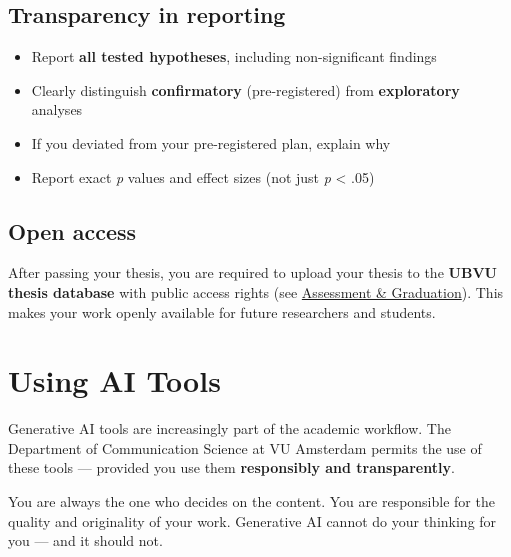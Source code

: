 \documentclass[
  11pt,
  a4paper,
]{scrbook}
\providecommand{\tightlist}{%
  \setlength{\itemsep}{0pt}\setlength{\parskip}{0pt}}\usepackage{longtable,booktabs,array}
\begin{document}
\section{Transparency in reporting}\label{transparency-in-reporting}

\begin{itemize}
\tightlist
\item
  Report \textbf{all tested hypotheses}, including non-significant
  findings
\item
  Clearly distinguish \textbf{confirmatory} (pre-registered) from
  \textbf{exploratory} analyses
\item
  If you deviated from your pre-registered plan, explain why
\item
  Report exact \emph{p} values and effect sizes (not just \emph{p}
  \textless{} .05)
\end{itemize}

\section{Open access}\label{open-access}

After passing your thesis, you are required to upload your thesis to the
\textbf{UBVU thesis database} with public access rights (see
\href{assessment.qmd}{Assessment \& Graduation}). This makes your work
openly available for future researchers and students.

\chapter{Using AI Tools}\label{using-ai-tools}

Generative AI tools are increasingly part of the academic workflow. The
Department of Communication Science at VU Amsterdam permits the use of
these tools --- provided you use them \textbf{responsibly and
transparently}.

\begin{tcolorbox}[enhanced jigsaw, bottomrule=.15mm, opacityback=0, toprule=.15mm, colframe=quarto-callout-important-color-frame, left=2mm, rightrule=.15mm, title=\textcolor{quarto-callout-important-color}{\faExclamation}\hspace{0.5em}{The core principle: Human in the Lead}, colbacktitle=quarto-callout-important-color!10!white, bottomtitle=1mm, colback=white, breakable, toptitle=1mm, titlerule=0mm, leftrule=.75mm, arc=.35mm, opacitybacktitle=0.6, coltitle=black]

You are always the one who decides on the content. You are responsible
for the quality and originality of your work. Generative AI cannot do
your thinking for you --- and it should not.

\end{tcolorbox}
\end{document}
